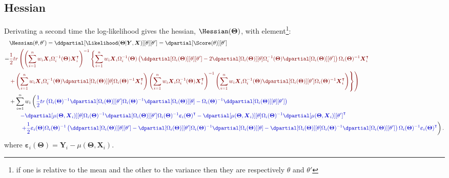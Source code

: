 \documentclass[12pt]{article}
\newcommand{\darkblue}{blue!80!black}
\newcommand{\darkred}{red!50!black}
\newcommand\trans[1]{{#1}^\intercal}%
\newcommand{\param}{\Theta}
\newcommand{\Vparam}{\boldsymbol{\param}}
\newcommand{\VX}{\boldsymbol{X}}
\newcommand{\VY}{\boldsymbol{Y}}
\newcommand{\Vvarepsilon}{\boldsymbol{\varepsilon}}
\begin{document}
\subsection{Hessian}
\label{SM:likelihood:hessian}
Derivating a second time the log-likelihood gives the hessian, \(\Hessian(\Vparam)\), with element\footnote{if one is relative to the mean and the other to the variance then they are respectively \(\theta\) and \(\theta'\)}:
\begin{align*}
& \Hessian(\theta,\theta^{\prime}) = \ddpartial[\Likelihood(\Vparam|\VY,\VX)][\theta][\theta^{\prime}] = \dpartial[\Score(\theta)][\theta^{\prime}] \\
=& \textcolor{\darkred}{\frac{1}{2} tr \left( \left(\sum_{i=1}^n w_i \VX_i \Omega_i^{-1}(\Vparam) \trans{\VX}_i\right)^{-1} \left\{ \sum_{i=1}^n w_i \VX_i \Omega_i^{-1}(\Vparam) \left(\ddpartial[\Omega_i(\Vparam)][\theta][\theta^{\prime}] - 2 \dpartial[\Omega_i(\Vparam)][\theta] \Omega_i^{-1}(\Vparam) \dpartial[\Omega_i(\Vparam)][\theta^{\prime}]\right)\Omega_i(\Vparam)^{-1} \trans{\VX}_i \right.  \right.}  \\
& \textcolor{\darkred}{ \left. \left. + \left(\sum_{i=1}^n w_i \VX_i \Omega_i^{-1}(\Vparam) \dpartial[\Omega_i(\Vparam)][\theta] \Omega_i(\Vparam)^{-1} \trans{\VX}_i\right) \left(\sum_{i=1}^n w_i \VX_i\Omega_i^{-1}(\Vparam) \trans{\VX}_i \right)^{-1} \left(\sum_{i=1}^n w_i \VX_i \Omega_i^{-1}(\Vparam) \dpartial[\Omega_i(\Vparam)][\theta^{\prime}] \Omega_i(\Vparam)^{-1} \trans{\VX}_i\right) \right\} \right) } \\
& +\sum_{i=1}^n w_i \left( \textcolor{\darkblue}{ \frac{1}{2} tr\left(\Omega_i(\Vparam)^{-1} \dpartial[\Omega_i(\Vparam)][\theta^{\prime}] \Omega_i(\Vparam)^{-1} \dpartial[\Omega_i(\Vparam)][\theta] - \Omega_i(\Vparam)^{-1} \ddpartial[\Omega_i(\Vparam)][\theta][\theta^{\prime}] \right) } \right.\\
& \qquad \textcolor{\darkblue}{ -  \dpartial[\mu(\Vparam,\VX_i)][\theta] \Omega_i(\Vparam)^{-1} \dpartial[\Omega_i(\Vparam)][\theta^{\prime}] \Omega_i(\Vparam)^{-1} \trans{\Vvarepsilon_i(\Vparam)} - \dpartial[\mu(\Vparam,\VX_i)][\theta] \Omega_i(\Vparam)^{-1} \trans{\dpartial[\mu(\Vparam,\VX_i)][\theta^{\prime}]} } \\
& \qquad \left. \textcolor{\darkblue}{ + \frac{1}{2} \Vvarepsilon_i(\Vparam) \Omega_i(\Vparam)^{-1} \left(\ddpartial[\Omega_i(\Vparam)][\theta][\theta^{\prime}] - \dpartial[\Omega_i(\Vparam)][\theta^{\prime}] \Omega_i(\Vparam)^{-1} \dpartial[\Omega_i(\Vparam)][\theta] - \dpartial[\Omega_i(\Vparam)][\theta] \Omega_i(\Vparam)^{-1} \dpartial[\Omega_i(\Vparam)][\theta^{\prime}] \right) \Omega_i(\Vparam)^{-1} \trans{\Vvarepsilon_i(\Vparam)} } \right).
\end{align*}
where \(\Vvarepsilon_i(\Vparam) = \VY_i-\mu(\Vparam,\VX_i)\).
\end{document}
